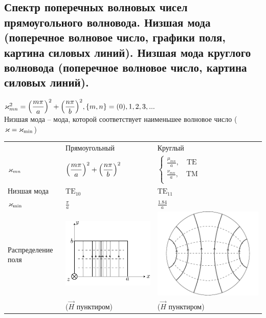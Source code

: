 \begin{multicols*}{2}
		\section{Спектр поперечных волновых чисел прямоугольного волновода. Низшая мода (поперечное волновое число, графики поля, картина силовых линий). Низшая мода круглого волновода (поперечное волновое число, картина силовых линий).}
		
		$\varkappa_{mn}^2=\qty(\dfrac{m\pi}{a})^2+\qty(\dfrac{n\pi}{b})^2, \{m,n\} = (0),1,2,3,...$ \\
		Низшая мода – мода, которой соответствует наименьшее волновое число ($\varkappa=\varkappa_\text{min}$) \\
		
		\begin{tabular}{l l l}
			{} & {Прямоугольный} & {Круглый} \\
			
			{$\varkappa_{mn}$} &
			{$\qty(\dfrac{m\pi}{a})^2+\qty(\dfrac{n\pi}{b})^2$} &
			{$\begin{cases}
					\frac{\mu_{mn}}{a}, \quad \text{TE} \\
					\frac{\nu_{mn}}{a}, \quad \text{TM}\\
				\end{cases}$} \\
			
			{Низшая мода} & {$\text{TE}_{10}$} & {$\text{TE}_{11}$} \\
			
			{$\varkappa_\text{min}$} & {$\frac \pi a$} & {$\frac {1.84}{a}$} \\
			
			{Распределение поля} &
			{\includegraphics[width=0.25\linewidth]{aed_imgs/lect4_ris8} } &
			{\includegraphics[width=0.25\linewidth]{aed_imgs/lect5_cylindric_TE11}}\\
			{} & {($\vec{H}$ пунктиром)} & {($\vec{H}$ пунктиром)} \\
		\end{tabular}
		

\end{multicols*}
